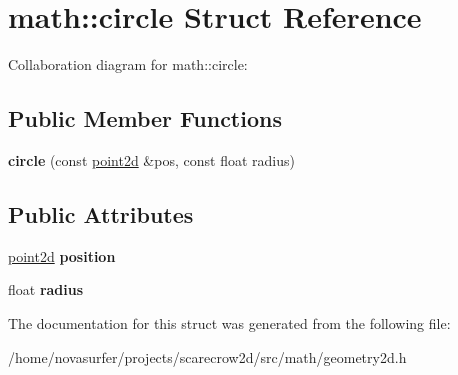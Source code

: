 \hypertarget{structmath_1_1circle}{}\section{math\+:\+:circle Struct Reference}
\label{structmath_1_1circle}


Collaboration diagram for math\+:\+:circle\+:
\subsection*{Public Member Functions}
\begin{DoxyCompactItemize}
\item 
\mbox{\label{structmath_1_1circle_a13f2731f7dc042e85559386828e0e67f}} 
{\bfseries circle} (const \hyperlink{structmath_1_1vec2}{point2d} \&pos, const float radius)
\end{DoxyCompactItemize}
\subsection*{Public Attributes}
\begin{DoxyCompactItemize}
\item 
\mbox{\label{structmath_1_1circle_aa1d666731d5505f95f10580825fe4ab6}} 
\hyperlink{structmath_1_1vec2}{point2d} {\bfseries position}
\item 
\mbox{\label{structmath_1_1circle_a82a735222f7bf99813b61dd5c1a21864}} 
float {\bfseries radius}
\end{DoxyCompactItemize}


The documentation for this struct was generated from the following file\+:\begin{DoxyCompactItemize}
\item 
/home/novasurfer/projects/scarecrow2d/src/math/geometry2d.\+h\end{DoxyCompactItemize}

